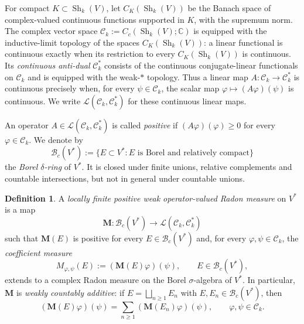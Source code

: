 \documentclass[11pt,reqno,a4paper]{amsart}
\numberwithin{equation}{section}
\theoremstyle{compact}
\theoremstyle{definition}
\newtheorem{definition}[definition]{Definition}
\theoremstyle{definition}
\newcommand{\Sh}{\operatorname{Sh}}
\begin{document}
For compact $K\subset\Sh_k(V)$, let $C_K(\Sh_k(V))$ be the Banach
space of complex-valued continuous functions supported in $K$, with the
supremum norm.  The complex vector space
$\mathcal C_k:=C_c(\Sh_k(V);\mathbb C)$ is equipped with the inductive-limit
topology of the spaces $C_K(\Sh_k(V))$: a linear functional is continuous
exactly when its restriction to every $C_K(\Sh_k(V))$ is continuous.  Its
\emph{continuous anti-dual}
$\mathcal C_k^*$ consists of the continuous conjugate-linear functionals on
$\mathcal C_k$ and is equipped with the weak-$*$ topology.  Thus a linear map
$A:\mathcal C_k\to\mathcal C_k^*$ is continuous precisely when, for every
$\psi\in\mathcal C_k$, the scalar map $\varphi\mapsto(A\varphi)(\psi)$ is
continuous.  We write $\mathcal L(\mathcal C_k,\mathcal C_k^*)$ for these
continuous linear maps.

An operator $A\in\mathcal L(\mathcal C_k,\mathcal C_k^*)$ is called
\emph{positive} if $(A\varphi)(\varphi)\geq0$ for every
$\varphi\in\mathcal C_k$.  We denote by
\begin{equation}\label{eq:borel-delta-ring}
  \mathscr B_c(V^*):=\{E\subset V^*: E\text{ is Borel and relatively compact}\}
\end{equation}
the \emph{Borel $\delta$-ring} of $V^*$.  It is closed under finite unions,
relative complements and countable intersections, but not in general under
countable unions.

\begin{definition}\label{def:operator-valued-radon-measure}
A \emph{locally finite positive weak operator-valued Radon measure} on $V^*$
is a map
\begin{equation}\label{eq:operator-valued-measure-map}
  \boldsymbol M:\mathscr B_c(V^*)\longrightarrow
  \mathcal L(\mathcal C_k,\mathcal C_k^*)
\end{equation}
such that $\boldsymbol M(E)$ is positive for every $E\in\mathscr B_c(V^*)$
and, for every $\varphi,\psi\in\mathcal C_k$, the \emph{coefficient measure}
\begin{equation}\label{eq:operator-coefficient-measure}
  M_{\varphi,\psi}(E):=(\boldsymbol M(E)\varphi)(\psi),
  \qquad E\in\mathscr B_c(V^*),
\end{equation}
extends to a complex Radon measure on the Borel $\sigma$-algebra of $V^*$.
In particular, $\boldsymbol M$ is \emph{weakly countably additive}: if
$E=\bigsqcup_{n\geq1}E_n$ with $E,E_n\in\mathscr B_c(V^*)$, then
\begin{equation}\label{eq:weak-countable-additivity}
  (\boldsymbol M(E)\varphi)(\psi)
  =\sum_{n\geq1}(\boldsymbol M(E_n)\varphi)(\psi),
  \qquad \varphi,\psi\in\mathcal C_k.
\end{equation}
\end{definition}
\end{document}
